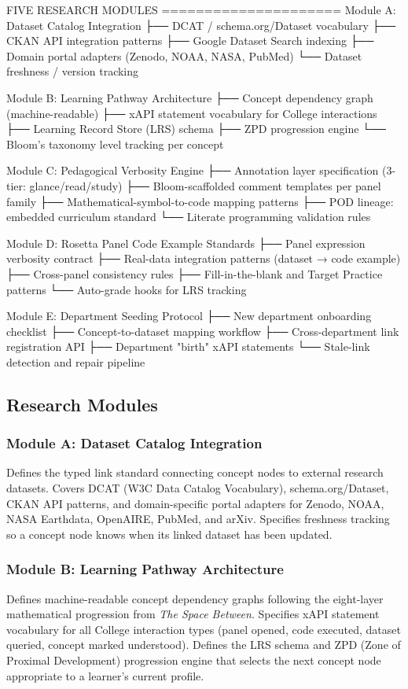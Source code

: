 \documentclass[11pt,letterpaper]{article}
\begin{document}
\begin{asciibox}
FIVE RESEARCH MODULES
=====================
Module A: Dataset Catalog Integration
  ├── DCAT / schema.org/Dataset vocabulary
  ├── CKAN API integration patterns
  ├── Google Dataset Search indexing
  ├── Domain portal adapters (Zenodo, NOAA, NASA, PubMed)
  └── Dataset freshness / version tracking

Module B: Learning Pathway Architecture
  ├── Concept dependency graph (machine-readable)
  ├── xAPI statement vocabulary for College interactions
  ├── Learning Record Store (LRS) schema
  ├── ZPD progression engine
  └── Bloom's taxonomy level tracking per concept

Module C: Pedagogical Verbosity Engine
  ├── Annotation layer specification (3-tier: glance/read/study)
  ├── Bloom-scaffolded comment templates per panel family
  ├── Mathematical-symbol-to-code mapping patterns
  ├── POD lineage: embedded curriculum standard
  └── Literate programming validation rules

Module D: Rosetta Panel Code Example Standards
  ├── Panel expression verbosity contract
  ├── Real-data integration patterns (dataset → code example)
  ├── Cross-panel consistency rules
  ├── Fill-in-the-blank and Target Practice patterns
  └── Auto-grade hooks for LRS tracking

Module E: Department Seeding Protocol
  ├── New department onboarding checklist
  ├── Concept-to-dataset mapping workflow
  ├── Cross-department link registration API
  ├── Department "birth" xAPI statements
  └── Stale-link detection and repair pipeline
\end{asciibox}

\subsection{Research Modules}

\subsubsection{Module A: Dataset Catalog Integration}
Defines the typed link standard connecting concept nodes to external research datasets. Covers DCAT (W3C Data Catalog Vocabulary), schema.org/Dataset, CKAN API patterns, and domain-specific portal adapters for Zenodo, NOAA, NASA Earthdata, OpenAIRE, PubMed, and arXiv. Specifies freshness tracking so a concept node knows when its linked dataset has been updated.

\subsubsection{Module B: Learning Pathway Architecture}
Defines machine-readable concept dependency graphs following the eight-layer mathematical progression from \textit{The Space Between}. Specifies xAPI statement vocabulary for all College interaction types (panel opened, code executed, dataset queried, concept marked understood). Defines the LRS schema and ZPD (Zone of Proximal Development) progression engine that selects the next concept node appropriate to a learner's current profile.
\end{document}
